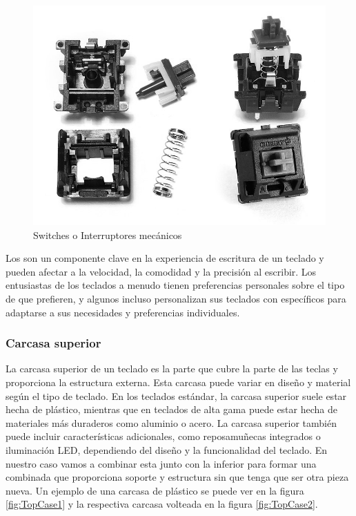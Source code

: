 \begin{figure}[H]
    \centering
    \includegraphics[width=1\textwidth]{imagenes/Capitulos/Cap03/Switches.png}
    \caption{Switches o Interruptores mecánicos \cite{SwitchesImageSource}}
    \label{fig:Switches}
\end{figure}

Los  son un componente clave en la experiencia de escritura de un teclado y pueden afectar a la velocidad, la comodidad y la precisión al escribir. Los entusiastas de los teclados a menudo tienen preferencias personales sobre el tipo de  que prefieren, y algunos incluso personalizan sus teclados con  específicos para adaptarse a sus necesidades y preferencias individuales.
\newpage
\subsubsection{Carcasa superior}

La carcasa superior de un teclado es la parte que cubre la parte de las teclas y proporciona la estructura externa. Esta carcasa puede variar en diseño y material según el tipo de teclado. En los teclados estándar, la carcasa superior suele estar hecha de plástico, mientras que en teclados de alta gama puede estar hecha de materiales más duraderos como aluminio o acero. La carcasa superior también puede incluir características adicionales, como reposamuñecas integrados o iluminación \gls{LED}, dependiendo del diseño y la funcionalidad del teclado. En nuestro caso vamos a combinar esta junto con la inferior para formar una combinada que proporciona soporte y estructura sin que tenga que ser otra pieza nueva. Un ejemplo de una carcasa de plástico se puede ver en la figura \ref{fig:TopCase1} y la respectiva carcasa volteada en la figura \ref{fig:TopCase2}.

